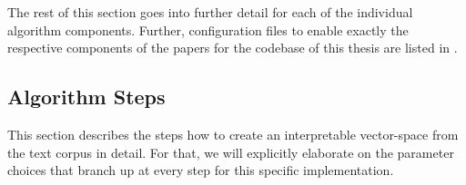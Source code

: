 The rest of this section goes into further detail for each of the individual algorithm components.  Further, configuration files to enable exactly the respective components of the papers \mainalgos for the codebase of this thesis are listed in .








\subsection{Algorithm Steps}
\label{sec:algorithm_steps}


This section describes the steps how to create an interpretable vector-space from the text corpus in detail. For that, we will explicitly elaborate on the parameter choices that branch up at every step for this specific implementation. %

